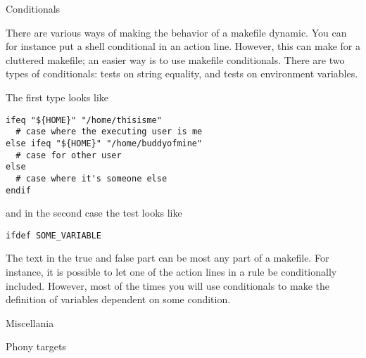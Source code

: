 \begin{multicols}{2}
  
  \columnbreak
  
\end{multicols}
\begin{multicols}{2}
  
  \columnbreak
  
\end{multicols}
\begin{multicols}{2}
  
  \columnbreak
  
\end{multicols}
\begin{multicols}{2}
  
  \columnbreak
  
\end{multicols}

 {Conditionals}

There are various ways of making the behavior of a makefile dynamic.
You can for instance put a shell conditional in an action line.
However, this can make for a cluttered makefile; an easier way is to use
makefile conditionals. There are two types of conditionals: tests on string
equality, and tests on environment variables.

The first type looks like
\begin{lstlisting}
ifeq "${HOME}" "/home/thisisme"
  # case where the executing user is me
else ifeq "${HOME}" "/home/buddyofmine"
  # case for other user 
else
  # case where it's someone else
endif
\end{lstlisting}
and in the second case the test looks like
\begin{lstlisting}
ifdef SOME_VARIABLE
\end{lstlisting}
The text in the true and false part can be most any part of a
makefile. For instance, it is possible to let one of the action lines
in a rule be conditionally included. However, most of the times you
will use conditionals to make the definition of variables dependent on
some condition.


 {Miscellania}

 {Phony targets}

